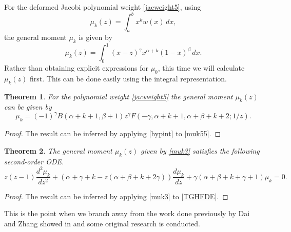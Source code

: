 \documentclass[12pt]{article}
\newtheorem{mydef}{Theorem}[section]
\numberwithin{figure}{section}
\numberwithin{equation}{section}
\numberwithin{table}{section}
\begin{document}
For the deformed Jacobi polynomial weight \eqref{jacweight5}, using
$$\mu_k(z)=\int^b_ax^kw(x)\,dx,$$
the general moment $\mu_k$ is given by
\begin{equation}
\mu_k(z)=\int^1_{0}(x-z)^\gamma x^{\alpha+k}(1-x)^\beta\,dx.\label{muk55}
\end{equation}
Rather than obtaining explicit expressions for $\mu_0$, this time we will calculate $\mu_k(z)$ first.
This can be done easily using the integral representation.
\begin{mydef}
For the  polynomial weight \eqref{jacweight5} the general moment $\mu_k(z)$ can be given by
\begin{equation}\label{muk3}
\mu_k=(-1)^\gamma B(\alpha+k+1,\beta+1)z^\gamma F(-\gamma,\alpha+k+1,\alpha+\beta+k+2;1/z).
\end{equation}
\end{mydef}
\begin{proof}
The result can be inferred by applying \eqref{hypint} to \eqref{muk55}.
\end{proof}
\begin{mydef}
The general moment $\mu_k(z)$ given by \eqref{muk3} satisfies the following second-order ODE.
\begin{equation}
z(z-1)\frac{d^2\mu_k}{dz^2}+(\alpha+\gamma+k-z(\alpha+\beta+k+2\gamma))\frac{d\mu_k}{dz}+\gamma(\alpha+\beta+k+\gamma+1)\mu_k=0.
\end{equation}
\end{mydef}
\begin{proof}
The result can be inferred by applying \eqref{muk3} to \eqref{TGHFDE}.
\end{proof}
This is the point when we branch away from the work done previously by Dai and Zhang showed in \cite{P:43:055207} and some original research is conducted.
\end{document}
